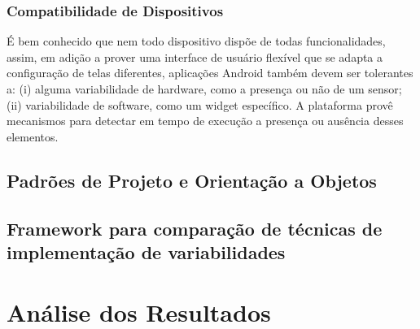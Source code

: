 \subsubsection{Compatibilidade de Dispositivos}

É bem conhecido que nem todo dispositivo dispõe de todas funcionalidades, assim,
em adição a prover uma interface de usuário flexível que se adapta a configuração
de telas diferentes, aplicações Android também devem ser tolerantes a: (i) alguma
variabilidade de hardware, como a presença ou não de um sensor; (ii) variabilidade
de software, como um widget específico. A plataforma provê mecanismos para detectar
em tempo de execução a presença ou ausência desses elementos.

\subsection{Padrões de Projeto e Orientação a Objetos}


\subsection{Framework para comparação de técnicas de implementação de variabilidades}

\section{Análise dos Resultados}

